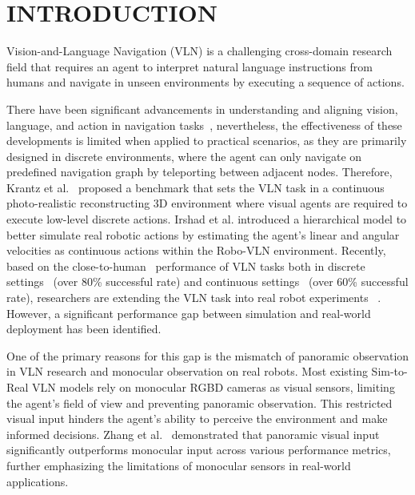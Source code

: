 \section{INTRODUCTION}
\vspace{-3pt}
Vision-and-Language Navigation (VLN) is a challenging cross-domain research field that requires an agent to interpret natural language instructions from humans and navigate in unseen environments by executing a sequence of actions. 

There have been significant advancements in understanding and aligning vision, language, and action in navigation tasks~\cite{anderson2018vision,qi2020reverie, ku2020room, hong2022bridging, wang2023scaling}, nevertheless, the effectiveness of these developments is limited when applied to practical scenarios, as they are primarily designed in discrete environments, where the agent can only navigate on predefined navigation graph by teleporting between adjacent nodes. Therefore, Krantz et al.~\cite{krantz2020beyond} proposed a benchmark that sets the VLN task in a continuous photo-realistic reconstructing 3D environment where visual agents are required to execute low-level discrete actions.
Irshad et al.\cite{irshad2021hierarchical} introduced a hierarchical model to better simulate real robotic actions by estimating the agent's linear and angular velocities as continuous actions within the Robo-VLN environment. Recently, based on the close-to-human~\cite{anderson2018vision} performance of VLN tasks both in discrete settings~\cite{wang2023scaling} (over 80\% successful rate) and continuous settings~\cite{an2022bevbert} (over 60\% successful rate), researchers are extending the VLN task into real robot experiments ~\cite{zhang2024navid, wang2024sim, li2024human, yokoyama2024vlfm}. However, a significant performance gap between simulation and real-world deployment has been identified.

One of the primary reasons for this gap is the mismatch of panoramic observation in VLN research and monocular observation on real robots. Most existing Sim-to-Real VLN models rely on monocular RGBD cameras as visual sensors, limiting the agent’s field of view and preventing panoramic observation. This restricted visual input hinders the agent’s ability to perceive the environment and make informed decisions. Zhang et al.~\cite{zhang2024vision} demonstrated that panoramic visual input significantly outperforms monocular input across various performance metrics, further emphasizing the limitations of monocular sensors in real-world applications.

